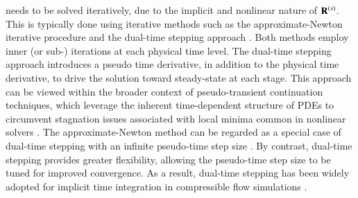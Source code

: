 {\begin{equation}
\end{equation}
needs to be solved iteratively, due to the implicit and nonlinear nature of $\mathbf{R}^{\left(s\right)}$. This is typically done using iterative methods such as the approximate-Newton iterative procedure \cite{rai1987navier} and the dual-time stepping approach \cite{jameson1991time,arnone1995integration,derango1997improvements}. Both methods employ inner (or sub-) iterations at each physical time level. 
The dual-time stepping approach introduces a pseudo time derivative, in addition to the physical time derivative, to drive the solution toward steady-state at each stage. 
This approach can be viewed within the broader context of pseudo-transient continuation techniques, which leverage the inherent time-dependent structure of PDEs to circumvent stagnation issues associated with local minima common in nonlinear solvers \cite{kelley1998convergence}.
The approximate-Newton method can be regarded as a special case of dual-time stepping with an infinite pseudo-time step size \cite{venkateswaran1995dual}. By contrast, dual-time stepping provides greater flexibility, allowing the pseudo-time step size to be tuned for improved convergence. As a result, dual-time stepping has been widely adopted for implicit time integration in compressible flow simulations \cite{zhang2004block,jameson2009assessment,liu2018dynamic}.
}
